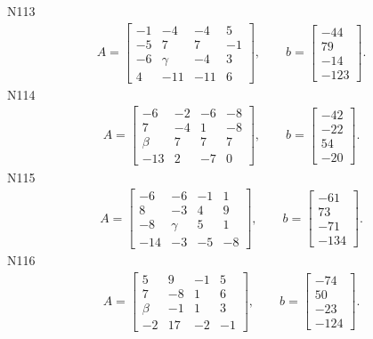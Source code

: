 \documentclass[11pt]{report}
\begin{document}
N113
\begin{align*}
 A = \left[\begin{matrix}-1 & -4 & -4 & 5\\-5 & 7 & 7 & -1\\-6 & \gamma & -4 & 3\\4 & -11 & -11 & 6\end{matrix}\right],
\qquad b = \left[\begin{matrix}-44\\79\\-14\\-123\end{matrix}\right]. 
 \end{align*}
N114
\begin{align*}
 A = \left[\begin{matrix}-6 & -2 & -6 & -8\\7 & -4 & 1 & -8\\\beta & 7 & 7 & 7\\-13 & 2 & -7 & 0\end{matrix}\right],
\qquad b = \left[\begin{matrix}-42\\-22\\54\\-20\end{matrix}\right]. 
 \end{align*}
N115
\begin{align*}
 A = \left[\begin{matrix}-6 & -6 & -1 & 1\\8 & -3 & 4 & 9\\-8 & \gamma & 5 & 1\\-14 & -3 & -5 & -8\end{matrix}\right],
\qquad b = \left[\begin{matrix}-61\\73\\-71\\-134\end{matrix}\right]. 
 \end{align*}
N116
\begin{align*}
 A = \left[\begin{matrix}5 & 9 & -1 & 5\\7 & -8 & 1 & 6\\\beta & -1 & 1 & 3\\-2 & 17 & -2 & -1\end{matrix}\right],
\qquad b = \left[\begin{matrix}-74\\50\\-23\\-124\end{matrix}\right]. 
 \end{align*}
\end{document}
